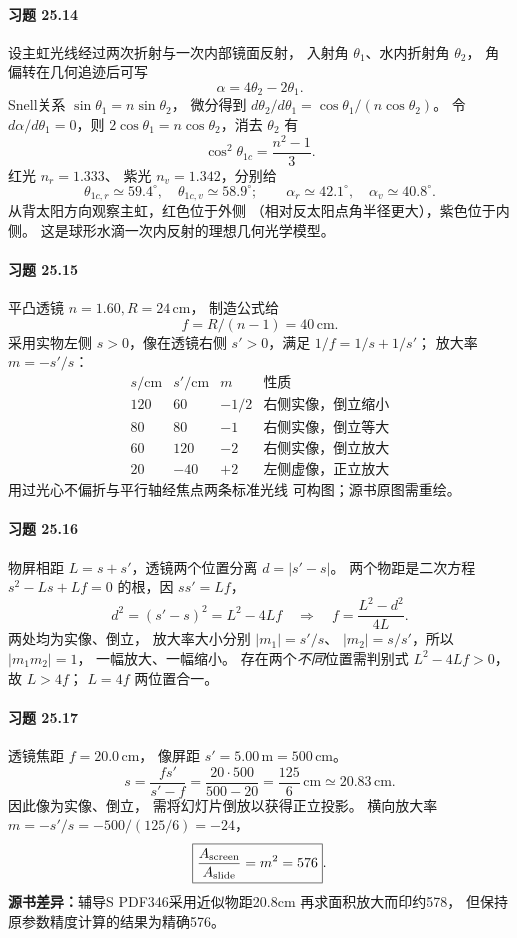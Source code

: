 \paragraph{习题 25.14}
设主虹光线经过两次折射与一次内部镜面反射，
入射角 \(\theta_1\)、水内折射角 \(\theta_2\)，
角偏转在几何追迹后可写
\[
\boxed{\alpha=4\theta_2-2\theta_1}.
\]
Snell关系 \(\sin\theta_1=n\sin\theta_2\)，
微分得到
\(d\theta_2/d\theta_1
=\cos\theta_1/(n\cos\theta_2)\)。
令 \(d\alpha/d\theta_1=0\)，则
\(2\cos\theta_1=n\cos\theta_2\)，消去
\(\theta_2\) 有
\[
\boxed{\cos^2\theta_{1c}=\frac{n^2-1}{3}}.
\]
红光 \(n_r=1.333\)、
紫光 \(n_v=1.342\)，分别给
\[
\theta_{1c,r}\simeq59.4^\circ,\quad
\theta_{1c,v}\simeq58.9^\circ;
\qquad
\boxed{\alpha_r\simeq42.1^\circ,\quad
\alpha_v\simeq40.8^\circ}.
\]
从背太阳方向观察主虹，红色位于外侧
（相对反太阳点角半径更大），紫色位于内侧。
这是球形水滴一次内反射的理想几何光学模型。

\paragraph{习题 25.15}
平凸透镜 \(n=1.60,R=24\,\mathrm{cm}\)，
制造公式给
\[
\boxed{f=R/(n-1)=40\,\mathrm{cm}}.
\]
采用实物左侧 \(s>0\)，像在透镜右侧
\(s'>0\)，满足 \(1/f=1/s+1/s'\)；
放大率 \(m=-s'/s\)：
\[
\begin{array}{c|c|c|l}
s/\mathrm{cm}&s'/\mathrm{cm}&m&\text{性质}\\\hline
120&60&-1/2&\text{右侧实像，倒立缩小}\\
80&80&-1&\text{右侧实像，倒立等大}\\
60&120&-2&\text{右侧实像，倒立放大}\\
20&-40&+2&\text{左侧虚像，正立放大}
\end{array}
\]
用过光心不偏折与平行轴经焦点两条标准光线
可构图；源书原图需重绘。

\paragraph{习题 25.16}
物屏相距 \(L=s+s'\)，透镜两个位置分离
\(d=|s'-s|\)。
两个物距是二次方程
\(s^2-Ls+Lf=0\) 的根，因
\(ss'=Lf\)，
\[
d^2=(s'-s)^2=L^2-4Lf
\quad\Longrightarrow\quad
\boxed{f=\frac{L^2-d^2}{4L}}.
\]
两处均为实像、倒立，
放大率大小分别 \(|m_1|=s'/s\)、
\(|m_2|=s/s'\)，所以
\(\boxed{|m_1m_2|=1}\)，
一幅放大、一幅缩小。
存在两个\emph{不同}位置需判别式 \(L^2-4Lf>0\)，
故 \(\boxed{L>4f}\)；
\(L=4f\) 两位置合一。

\paragraph{习题 25.17}
透镜焦距 \(f=20.0\,\mathrm{cm}\)，
像屏距 \(s'=5.00\,\mathrm m=500\,\mathrm{cm}\)。
\[
\boxed{s=\frac{fs'}{s'-f}
=\frac{20\cdot500}{500-20}
=\frac{125}{6}\,\mathrm{cm}
\simeq20.83\,\mathrm{cm}}.
\]
因此像为实像、倒立，
需将幻灯片倒放以获得正立投影。
横向放大率
\(m=-s'/s=-500/(125/6)=-24\)，
\[
\boxed{\frac{A_{\rm screen}}{A_{\rm slide}}
=m^2=576}.
\]
\textbf{源书差异：}辅导S PDF346采用近似物距20.8cm
再求面积放大而印约578，
但保持原参数精度计算的结果为精确576。

